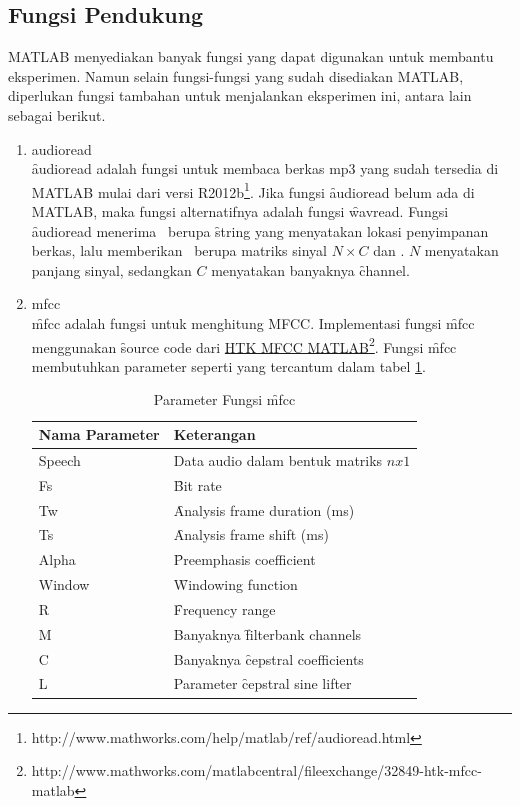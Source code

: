   \subsection{Fungsi Pendukung} \label{fungsipendukung}
  MATLAB menyediakan banyak fungsi yang dapat digunakan untuk membantu eksperimen. Namun selain fungsi-fungsi yang sudah disediakan MATLAB, diperlukan fungsi tambahan untuk menjalankan eksperimen ini, antara lain sebagai berikut.
  \begin{enumerate}
    \item audioread\\
    \f{audioread} adalah fungsi untuk membaca berkas mp3 yang sudah tersedia di MATLAB mulai dari versi R2012b\footnote{http://www.mathworks.com/help/matlab/ref/audioread.html}. Jika fungsi \f{audioread} belum ada di MATLAB, maka fungsi alternatifnya adalah fungsi \f{wavread}. Fungsi \f{audioread} menerima \ioa~berupa \f{string} yang menyatakan lokasi penyimpanan berkas, lalu memberikan \iob~berupa matriks sinyal $N \times C$ dan \br. $N$ menyatakan panjang sinyal, sedangkan $C$ menyatakan banyaknya \f{channel}.

    \item mfcc\\
    \f{mfcc} adalah fungsi untuk menghitung MFCC. Implementasi fungsi \f{mfcc} menggunakan \f{source code} dari \href{http://www.mathworks.com/matlabcentral/fileexchange/32849-htk-mfcc-matlab}{HTK MFCC MATLAB}\footnote{http://www.mathworks.com/matlabcentral/fileexchange/32849-htk-mfcc-matlab}. Fungsi \f{mfcc} membutuhkan parameter seperti yang tercantum dalam tabel \ref{table:parametermfcc}.

    \begin{table}
      \centering
      \caption{Parameter Fungsi \f{mfcc}}
      \begin{tabular}{|l|l|}
        \hline
        \textbf{Nama Parameter} & \textbf{Keterangan} \\ \hline
        Speech & Data audio dalam bentuk matriks $nx1$ \\ \hline
        Fs & \f{Bit rate} \\ \hline
        Tw & \f{Analysis frame duration} (ms) \\ \hline
        Ts & \f{Analysis frame shift} (ms) \\ \hline
        Alpha & \f{Preemphasis coefficient} \\ \hline
        Window & \f{Windowing function} \\ \hline
        R & \f{Frequency range} \\ \hline
        M & Banyaknya \f{filterbank channels} \\ \hline
        C & Banyaknya \f{cepstral coefficients} \\ \hline
        L & Parameter \f{cepstral sine lifter} \\ \hline
      \end{tabular}
      \label{table:parametermfcc}
    \end{table}


\end{enumerate}
